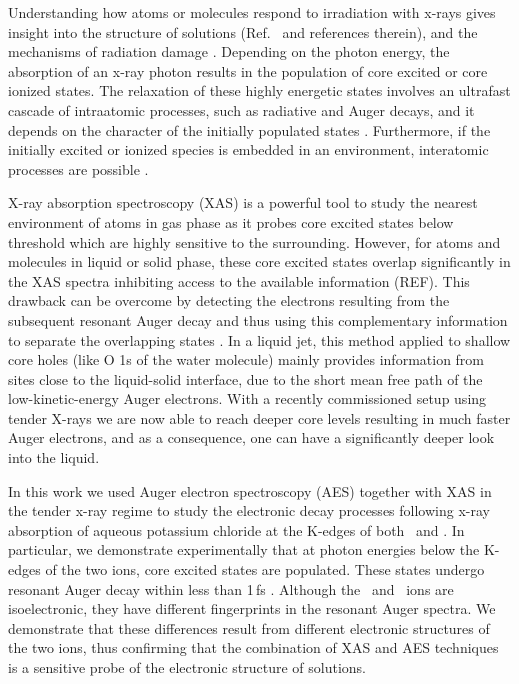 Understanding how atoms or molecules respond to irradiation with x-rays gives insight into the structure of solutions (Ref.\ \citep{smith17:13909} and references therein), and the mechanisms of radiation damage \citep{ONeill02:329,Carugo05:213,Stumpf16:237}. Depending on the photon energy, the absorption of an x-ray photon results in the population of core excited or core ionized states. The relaxation of these highly energetic states involves an ultrafast cascade of intraatomic processes, such as radiative and Auger decays, and it depends on the character of the initially populated states \citep{stoychev08:074307,Demekhin08:043421,Demekhin09:104303,Ouchi11:053415,Miteva14:164303,travnikova16:213001,Gokhberg14:661,Trinter14:664}. Furthermore, if the initially excited or ionized species is embedded in an environment, interatomic processes are possible  \citep{Pokapanich09:7264,Pokapanich11:13430,Stumpf16:237,unger17:708,ceolin17:263003}.

X-ray absorption spectroscopy (XAS) is a powerful tool to study the nearest environment of atoms in gas phase as it probes core excited states below threshold which are highly sensitive to the surrounding. However, for atoms and molecules in liquid or solid phase, these core excited states overlap significantly in the XAS spectra inhibiting access to the available information {\color{red}(REF)}. This drawback can be overcome by detecting the electrons resulting from the subsequent resonant Auger decay and thus using this complementary information to separate the overlapping states \citep{goldsz16:15133}. In a liquid jet, this method applied to shallow core holes (like O 1s of the water molecule) mainly provides information from sites close to the liquid-solid interface, due to the short mean free path of the low-kinetic-energy Auger electrons. With a recently commissioned setup using tender X-rays {\color{red}\citep{ceolin13:188,rueff15:175}} we are now able to reach deeper core levels resulting in much faster Auger electrons, and as a consequence, one can have a significantly deeper look into the liquid. 


In this work we used Auger electron spectroscopy (AES) together with XAS in the tender x-ray regime to study the electronic decay processes following x-ray absorption of aqueous potassium chloride at the K-edges of both \ki~and \cli. In particular, we demonstrate experimentally that at photon energies below the K-edges of the two ions, core excited states are populated. These states undergo resonant Auger decay within less than 1\,fs \citep{ceolin17:263003}. Although the \ki~and \cli~ions are isoelectronic, they have different fingerprints in the resonant Auger spectra. We demonstrate that these differences result from different electronic structures of the two ions, thus confirming that the combination of XAS and AES techniques is a sensitive probe of the electronic structure of solutions.



